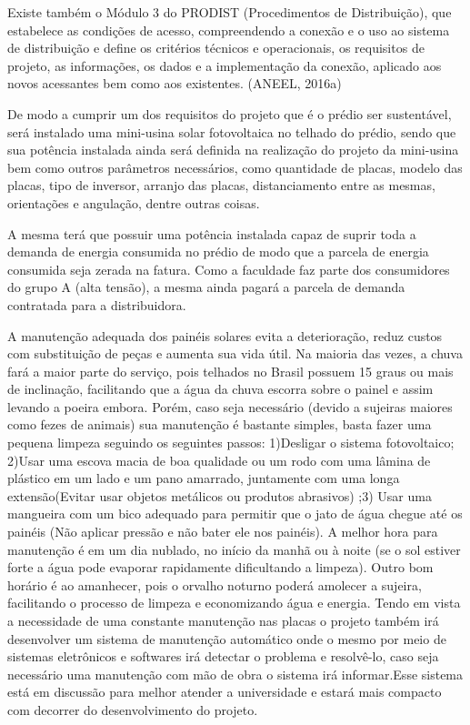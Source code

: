 Existe também o Módulo 3 do PRODIST (Procedimentos de Distribuição), que estabelece as condições de acesso, compreendendo a conexão e o uso ao sistema de distribuição e define os critérios técnicos e operacionais, os requisitos de projeto, as informações, os dados e a implementação da conexão, aplicado aos novos acessantes bem como aos existentes. (ANEEL, 2016a)

De modo a cumprir um dos requisitos do projeto que é o prédio ser sustentável, será instalado uma mini-usina solar fotovoltaica no telhado do prédio, sendo que sua potência instalada ainda será definida na realização do projeto da mini-usina bem como outros parâmetros necessários, como quantidade de placas, modelo das placas, tipo de inversor, arranjo das placas, distanciamento entre as mesmas, orientações e angulação, dentre outras coisas.

A mesma terá que possuir uma potência instalada capaz de suprir toda a demanda de energia consumida no prédio de modo que a parcela de energia consumida seja zerada na fatura. Como a faculdade faz parte dos consumidores do grupo A (alta tensão), a mesma ainda pagará a parcela de demanda contratada para a distribuidora.

A manutenção adequada dos painéis solares evita a deterioração, reduz custos com substituição de peças e aumenta sua vida útil. Na maioria das vezes, a chuva fará a maior parte do serviço, pois telhados no Brasil possuem 15 graus ou mais de inclinação, facilitando que a água da chuva escorra sobre o painel e assim levando a poeira embora. Porém, caso seja necessário (devido a sujeiras maiores como fezes de animais) sua manutenção é bastante simples, basta fazer uma pequena limpeza seguindo os seguintes passos: 1)Desligar o sistema fotovoltaico; 2)Usar uma escova macia de boa qualidade ou um rodo com uma lâmina de plástico em um lado e um pano amarrado, juntamente com uma longa extensão(Evitar usar objetos metálicos ou produtos abrasivos) ;3) Usar uma mangueira com um bico adequado para permitir que o jato de água chegue até os painéis (Não aplicar pressão e não bater ele nos painéis). A melhor hora para manutenção é em um dia nublado, no início da manhã ou à noite (se o sol estiver forte a água pode evaporar rapidamente dificultando a limpeza). Outro bom horário é ao amanhecer, pois o orvalho noturno poderá amolecer a sujeira, facilitando o processo de limpeza e economizando água e energia.
Tendo em vista a necessidade de uma constante manutenção nas placas o projeto também irá desenvolver um sistema de manutenção automático onde o mesmo por meio de sistemas eletrônicos e softwares irá detectar o problema e resolvê-lo, caso seja necessário uma manutenção com mão de obra o sistema irá informar.Esse sistema está em discussão para melhor atender a universidade e estará mais compacto com decorrer do desenvolvimento do projeto.

